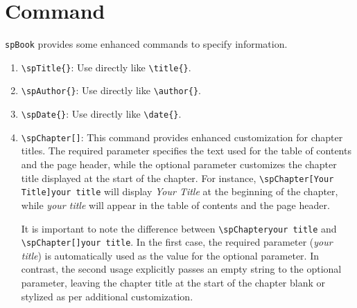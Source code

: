 \section{Command}
    \texttt{spBook} provides some enhanced commands to specify information. 
    \begin{enumerate}
        \item \texttt{\textbackslash spTitle\{\}}: Use directly like \texttt{\textbackslash title\{\}}.
        \item \texttt{\textbackslash spAuthor\{\}}: Use directly like \texttt{\textbackslash author\{\}}.
        \item \texttt{\textbackslash spDate\{\}}: Use directly like \texttt{\textbackslash date\{\}}.
        \item \texttt{\textbackslash spChapter[]{}}: This command provides enhanced customization for chapter titles. The required parameter specifies the text used for the table of contents and the page header, while the optional parameter customizes the chapter title displayed at the start of the chapter. For instance, \texttt{\textbackslash spChapter[Your Title]{your title}} will display \emph{Your Title} at the beginning of the chapter, while \emph{your title} will appear in the table of contents and the page header.

        It is important to note the difference between \texttt{\textbackslash spChapter{your title}} and \texttt{\textbackslash spChapter[]{your title}}. In the first case, the required parameter (\emph{your title}) is automatically used as the value for the optional parameter. In contrast, the second usage explicitly passes an empty string to the optional parameter, leaving the chapter title at the start of the chapter blank or stylized as per additional customization.
    \end{enumerate}